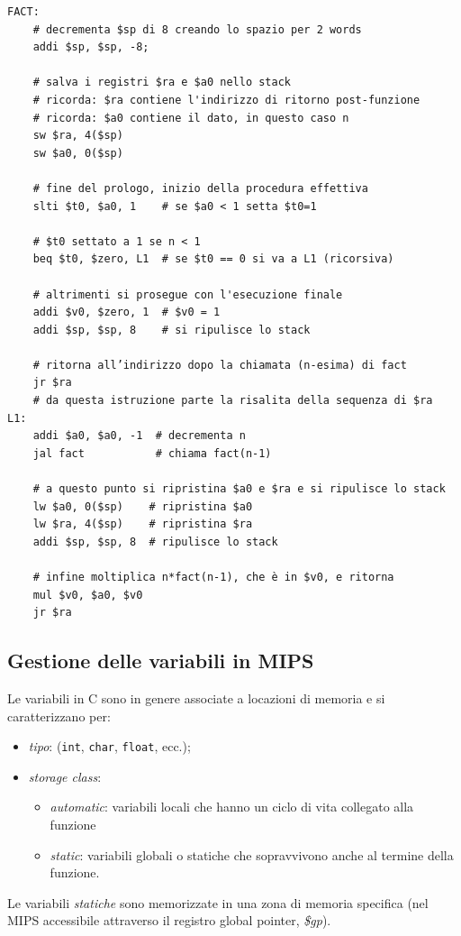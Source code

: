 \documentclass[class=book, crop=false]{standalone}
\begin{document}
\begin{verbatim}
FACT:
	# decrementa $sp di 8 creando lo spazio per 2 words
	addi $sp, $sp, -8;

	# salva i registri $ra e $a0 nello stack
	# ricorda: $ra contiene l'indirizzo di ritorno post-funzione
	# ricorda: $a0 contiene il dato, in questo caso n
	sw $ra, 4($sp)
	sw $a0, 0($sp)

	# fine del prologo, inizio della procedura effettiva
	slti $t0, $a0, 1    # se $a0 < 1 setta $t0=1

	# $t0 settato a 1 se n < 1
	beq $t0, $zero, L1  # se $t0 == 0 si va a L1 (ricorsiva)

	# altrimenti si prosegue con l'esecuzione finale
	addi $v0, $zero, 1  # $v0 = 1
	addi $sp, $sp, 8    # si ripulisce lo stack

	# ritorna all’indirizzo dopo la chiamata (n-esima) di fact
	jr $ra
	# da questa istruzione parte la risalita della sequenza di $ra
L1:
	addi $a0, $a0, -1  # decrementa n
	jal fact           # chiama fact(n-1)

	# a questo punto si ripristina $a0 e $ra e si ripulisce lo stack
	lw $a0, 0($sp)    # ripristina $a0
	lw $ra, 4($sp)    # ripristina $ra
	addi $sp, $sp, 8  # ripulisce lo stack

	# infine moltiplica n*fact(n-1), che è in $v0, e ritorna
	mul $v0, $a0, $v0
	jr $ra
\end{verbatim}

\subsection{Gestione delle variabili in MIPS}
Le variabili in C sono in genere associate a locazioni di memoria e si caratterizzano per:
\begin{itemize}
	\item \emph{tipo}: (\texttt{int}, \texttt{char}, \texttt{float}, ecc.);
	\item \emph{storage class}:
	\begin{itemize}
		\item \emph{automatic}: variabili locali che hanno un ciclo di vita collegato alla funzione
		\item \emph{static}: variabili globali o statiche che sopravvivono anche al termine della funzione.
	\end{itemize}
\end{itemize}

Le variabili \emph{statiche} sono memorizzate in una zona di memoria specifica (nel MIPS accessibile attraverso il registro global pointer, \emph{\$gp}).
\end{document}

